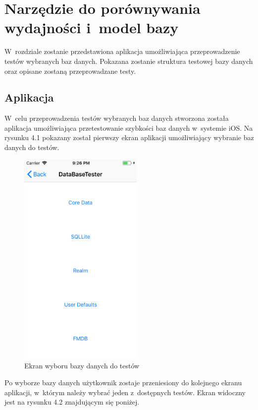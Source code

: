 \section{Narzędzie do porównywania wydajności i~model bazy }

 W~rozdziale zostanie przedstawiona aplikacja umożliwiająca przeprowadzenie testów wybranych baz danych. Pokazana zostanie struktura testowej bazy danych oraz opisane zostaną przeprowadzane testy.

\subsection{Aplikacja}

 W~celu przeprowadzenia testów wybranych baz danych stworzona została aplikacja umożliwiająca przetestowanie szybkości baz danych w~systemie iOS. Na rysunku 4.1 pokazany został pierwszy ekran aplikacji umożliwiający wybranie baz danych do testów. 

\begin{figure}[h]
\centering
	\includegraphics[width=6cm]{img/application/app-first-view.png}
	\caption{Ekran wyboru bazy danych do testów}
	\label{fig: first_app_view}
\end{figure}

Po wyborze bazy danych użytkownik zostaje przeniesiony do kolejnego ekranu aplikacji, w~którym należy wybrać jeden z~dostępnych testów. Ekran widoczny jest na rysunku 4.2 znajdującym się poniżej.

